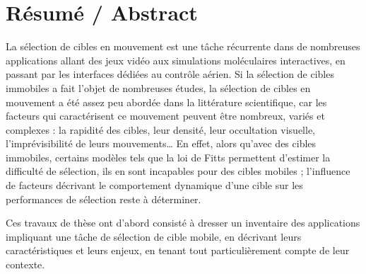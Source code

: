 
\chapter*{Résumé / Abstract}%

\mtcaddchapter %

%

\pagestyle{plain}

	La sélection de cibles en mouvement est une tâche récurrente dans de nombreuses applications allant des jeux vidéo aux simulations moléculaires interactives, en passant par les interfaces dédiées au contrôle aérien. Si la sélection de cibles immobiles a fait l'objet de nombreuses études, la sélection de cibles en mouvement a été assez peu abordée dans la littérature scientifique, car les facteurs qui caractérisent ce mouvement peuvent être nombreux, variés et complexes : la rapidité des cibles, leur densité, leur occultation visuelle, l'imprévisibilité de leurs mouvements\ldots{} En effet, alors qu’avec des cibles immobiles, certains modèles tels que la loi de Fitts permettent d’estimer la difficulté de sélection, ils en sont incapables pour des cibles mobiles ; l'influence de facteurs décrivant le comportement dynamique d'une cible sur les performances de sélection reste à déterminer.

	Ces travaux de thèse ont d'abord consisté à dresser un inventaire des applications impliquant une tâche de sélection de cible mobile, en décrivant leurs caractéristiques et leurs enjeux, en tenant tout particulièrement compte de leur contexte.
	
